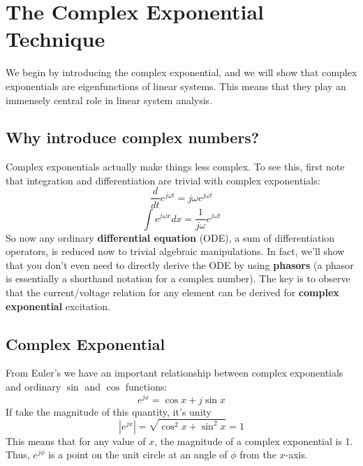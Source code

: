 \section{The Complex Exponential Technique}
We begin by introducing the complex exponential, and we will show that complex exponentials are eigenfunctions of linear systems.  This means that they play an immensely central role in linear system analysis.
\subsection{Why introduce complex numbers?}
Complex exponentials actually make things less complex.  To see this, first note that integration and differentiation are trivial with complex exponentials:
    \begin{equation}
        \frac{d}{dt} e^{j\omega t} = j \omega e^{j\omega t}
    \end{equation}
    \begin{equation}
        \int e^{j\omega x} dx = \frac{1}{j \omega} e^{j\omega t}
    \end{equation}
So now any ordinary \textbf{differential equation} (ODE), a sum of differentiation operators, is reduced now to trivial algebraic manipulations.  In fact, we'll show that you don't even need to directly derive the ODE by using \textbf{phasors} (a phasor is essentially a shorthand notation for a complex number).   The key is to observe that the current/voltage relation for any element can be derived for \textbf{complex exponential} excitation.
\subsection{Complex Exponential}
From Euler's we have an important relationship between complex exponentials and ordinary $\sin$ and $\cos$ functions:
    \begin{equation}
        e^{j x} = \cos x + j \sin x
    \end{equation}
If take the magnitude of this quantity, it's unity
    \begin{equation}
        | e^{j x} | = \sqrt{\cos^2 x +  \sin^2 x}  = 1
    \end{equation}
This means that for any value of $x$, the magnitude of a complex exponential is 1.  Thus,  $e^{j\phi}$ is a point on the unit circle at an angle of $\phi$ from the $x$-axis. 

